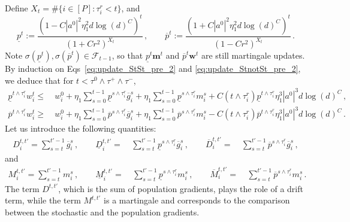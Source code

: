 \documentclass[11pt]{article}
\newcommand{\<}{\langle}
\renewcommand{\>}{\rangle}
\newcommand{\op}{{\rm op}}
\theoremstyle{definition}
\def\bw{{\boldsymbol w}}
\def\cF{{\mathcal F}}
\def\bw{{\boldsymbol w}}
\def\cF{{\mathcal F}}
\def\og{\overline{g}}
\def\bm{\boldsymbol{m}}
\def\uD{\underline{D}}
\def\uM{\underline{M}}
\def\op{\overline{p}}
\def\up{\underline{p}}
\def\oD{\overline{D}}
\def\oM{\overline{M}}
\def\oD{\overline{D}}
\begin{document}
Define $X_t = \# \{ i \in [P]: \tau_i^r < t \}$, and
\[
\up^t := \frac{ (1 - C|a^0|^2 \eta_1^2 d \log(d)^{C} )^t }{(1+ Cr^2)^{X_t}}\, , \qquad \op^t :=  \frac{ (1 + C|a^0|^2 \eta_1^2 d \log(d)^{C} )^t }{(1- Cr^2)^{X_t}} \, .
\]
Note $\sigma(\up^t), \sigma (\op^t) \in \cF_{t-1}$, so that $\up^t \bm^t$ and $\op^t \bw^t$ are still martingale updates.
By induction on Eqs~\eqref{eq:update_StSt_pre_2} and \eqref{eq:update_StnotSt_pre_2}, we deduce that for $t <\tau^0 \wedge \tau^+ \wedge \tau^-$,
\begin{equation}
    \begin{aligned}
    \up^{t \wedge \tau_i^r} w_i^t \leq&~ w_i^0 + \eta_1 \sum_{s= 0}^{t-1}  \up^{s \wedge \tau_i^r} \og_i^s + \eta_1 \sum_{s= 0}^{t-1} \up^{s \wedge \tau_i^r} m_i^s + C (t \wedge \tau_i^r) \up^{t \wedge \tau_i^r} \eta_1^3 |a^0|^3 d \log(d)^C \, , \\
    \op^{t \wedge \tau_i^r} w_i^t \geq&~ w_i^0 + \eta_1 \sum_{s= 0}^{t-1}  \op^{s \wedge \tau_i^r} \og_i^s + \eta_1 \sum_{s= 0}^{t-1} \op^{s \wedge \tau_i^r} m_i^s -   C (t \wedge \tau_i^r) \op^{t \wedge \tau_i^r} \eta_1^3 |a^0|^3 d \log(d)^C \, .
    \end{aligned}
\end{equation}
Let us introduce the following quantities:
\[
\begin{aligned}
D_i^{t,t'} =  \sum_{s = t}^{t'-1}  \og_i^s\, , \qquad \uD_i^{t,t'} = &~ \sum_{s = t}^{t'-1} \up^{s \wedge \tau_i^r} \og_i^s\, , \qquad \oD_i^{t,t'} = &~ \sum_{s = t}^{t'-1} \op^{s \wedge \tau_i^r} \og_i^s \, ,
\end{aligned}
\]
and 
\[
\begin{aligned}
M_i^{t,t'} =  \sum_{s = t}^{t'-1}  m_i^s\, , \qquad \uM_i^{t,t'} = &~ \sum_{s = t}^{t'-1} \up^{s \wedge \tau_i^r} m_i^s\, , \qquad \oM_i^{t,t'} = &~ \sum_{s = t}^{t'-1} \op^{s \wedge \tau_i^r} m_i^s \, .
\end{aligned}
\]
The term $D^{t,t'}$, which is the sum of population gradients, plays the role of a drift term, while the term $M^{t,t'} $ is a martingale and corresponds to the comparison between the stochastic and the population gradients.
\end{document}
